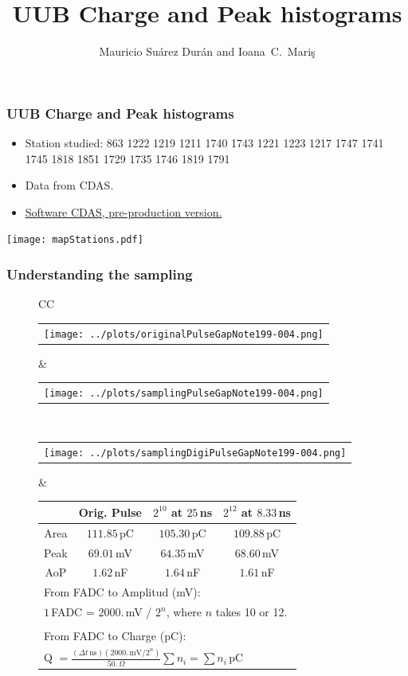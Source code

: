 \documentclass[aspectratio=169]{beamer}
\title{UUB Charge and Peak histograms}
\author{
  Mauricio Su\'arez Dur\'an and Ioana~C.~Mari\c{s}
}
\institute{IIHE-ULB}
\begin{document}
\begin{frame}
  \titlepage
\end{frame}


\begin{frame}
	\frametitle{UUB Charge and Peak histograms}
	\begin{itemize}
		\item Station studied: 863 1222 1219 1211 1740 1743 1221 1223 1217 1747 1741 1745 1818 1851 1729 1735 1746 1819 1791
		\item Data from CDAS.
		\item {\underline {Software CDAS, pre-production version.}}
	\end{itemize}
	\centering
	\texttt{[image: mapStations.pdf]}
\end{frame}


\begin{frame}
  \frametitle{Understanding the sampling}
  \begin{figure}
    \centering
    \begin{tabularx}{\textwidth}{CC}
      \begin{tabular}{l}
        \texttt{[image: ../plots/originalPulseGapNote199-004.png]}
      \end{tabular}
      &
      \begin{tabular}{l}
        \texttt{[image: ../plots/samplingPulseGapNote199-004.png]}
      \end{tabular}
      \\
      \begin{tabular}{l}
        \texttt{[image: ../plots/samplingDigiPulseGapNote199-004.png]}
      \end{tabular}
      &
      \footnotesize
      \begin{tabular}{c|c|c|c}
        {} & Orig. Pulse & $2^{10}$ at $25$\,ns & $2^{12}$ at $8.33$\,ns \\ \hline
        Area & $111.85$\,pC & $105.30$\,pC & $109.88$\,pC \\
        Peak & $69.01$\,mV & $64.35$\,mV & $68.60$\,mV \\
        AoP & $1.62$\,nF & $1.64$\,nF & $1.61$\,nF \\ 
        \multicolumn{4}{l}{From FADC to Amplitud (mV):} \\
        \multicolumn{4}{l}{$1$\,FADC = $2000.$\,mV / $2^{n}$, where $n$ takes 10 or 12.} \\
        \multicolumn{4}{l}{} \\
        \multicolumn{4}{l}{From FADC to Charge (pC):} \\
        \multicolumn{4}{l}{Q $= \frac{(\Delta t\,\mathrm{ns})(2000.\,\mathrm{mV} / 2^{n})}{50.\,\Omega} \sum{n_i}
        = \sum{n_i}$\,pC}
      \end{tabular}
    \end{tabularx}
  \end{figure}
\end{frame}
\end{document}
